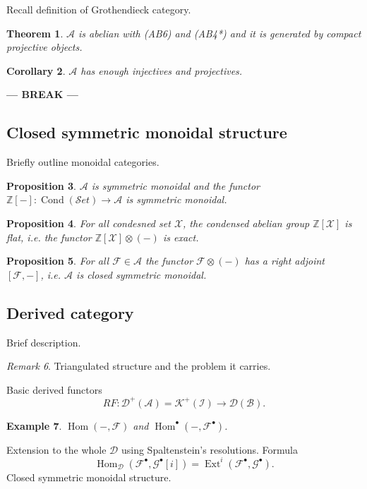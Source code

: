 \documentclass[12pt]{article}
\theoremstyle{darkgreentheorem}
\newtheorem{thm}{Theorem}
\newtheorem{prop}[thm]{Proposition}
\newtheorem{cor}[thm]{Corollary}
\theoremstyle{darkbluedefinition}
\theoremstyle{darkredexample}
\newtheorem{exa}[thm]{Example}
\theoremstyle{remark}
\newtheorem{rem}[thm]{Remark}
\newcommand{\Z}{\mathbb{Z}}
\newcommand{\1}{\mathbbm{1}}
\newcommand{\A}{\mathscr{A}}
\newcommand{\Set}{\mathscr{S}et}
\newcommand{\D}{\mathscr{D}}
\newcommand{\K}{\mathscr{K}}
\newcommand{\F}{\mathcal{F}}
\newcommand{\G}{\mathcal{G}}
\newcommand{\X}{\mathcal{X}}
\DeclareMathOperator{\Hom}{Hom}
\DeclareMathOperator{\Ext}{Ext}
\DeclareMathOperator{\Cond}{Cond}
\newcommand{\ot}{\otimes}
\newcommand{\grd}{^{\bullet}}
\begin{document}
Recall definition of Grothendieck category.

\begin{thm}
    $\A$ is abelian with (AB6) and (AB4*) and it is generated by compact projective objects.
\end{thm}

\begin{cor}
    $\A$ has enough injectives and projectives.
\end{cor}

\begin{center}
    \textbf{--- BREAK ---}
\end{center}

\subsection{Closed symmetric monoidal structure}

Briefly outline monoidal categories.

\begin{prop}
    $\A$ is symmetric monoidal and the functor $\Z[-]\colon \Cond(\Set)\to \A$ is symmetric monoidal.
\end{prop}

\begin{prop}
    For all condesned set $\X$, the condensed abelian group $\Z[\X]$ is flat, i.e. the functor $\Z[\X]\ot (-)$ is exact.
\end{prop}

\begin{prop}
    For all $\F\in\A$ the functor $\F\ot(-)$ has a right adjoint $[\F,-]$, i.e. $\A$ is closed symmetric monoidal.
\end{prop}

\subsection{Derived category}

Brief description.

\begin{rem}
    Triangulated structure and the problem it carries.
\end{rem}

Basic derived functors
\[ RF\colon \D^{+}(\A)=\K^{+}(\mathcal{I})\to \D(\mathscr{B}). \]

\begin{exa}
    $\Hom(-,\F)$ and $\Hom\grd(-,\F\grd)$.
\end{exa}

Extension to the whole $\D$ using Spaltenstein's resolutions.
Formula
\[ \Hom_{\D}(\F\grd,\G\grd[i])=\Ext^{i}(\F\grd,\G\grd).\]
Closed symmetric monoidal structure.
\end{document}
